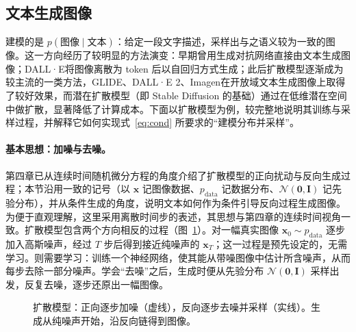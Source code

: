 \subsection{文本生成图像}
\label{sub:t2i}

建模的是 $p(\text{图像}\mid\text{文本})$：给定一段文字描述，采样出与之语义较为一致的图像。这一方向经历了较明显的方法演变：早期曾用生成对抗网络直接由文本生成图像；DALL·E\cite{dalle}将图像离散为 token 后以自回归方式生成；此后扩散模型逐渐成为较主流的一类方法，GLIDE\cite{glide}、DALL·E 2\cite{dalle2}、Imagen\cite{imagen}在开放域文本生成图像上取得了较好效果，而潜在扩散模型\cite{ldm}（即 Stable Diffusion 的基础）通过在低维潜在空间中做扩散，显著降低了计算成本。下面以扩散模型为例，较完整地说明其训练与采样过程，并解释它如何实现式~\eqref{eq:cond} 所要求的“建模分布并采样”。

\paragraph{基本思想：加噪与去噪。}第四章已从连续时间随机微分方程的角度介绍了扩散模型的正向扰动与反向生成过程；本节沿用一致的记号（以 $\mathbf{x}$ 记图像数据、$p_{\text{data}}$ 记数据分布、$\mathcal{N}(\mathbf{0},\mathbf{I})$ 记先验分布），并从条件生成的角度，说明文本如何作为条件引导反向过程生成图像。为便于直观理解，这里采用离散时间步的表述，其思想与第四章的连续时间视角一致。扩散模型包含两个方向相反的过程（图~\ref{fig:diffusion}）。对一幅真实图像 $\mathbf{x}_0\sim p_{\text{data}}$ 逐步加入高斯噪声，经过 $T$ 步后得到接近纯噪声的 $\mathbf{x}_T$；这一过程是预先设定的，无需学习。则需要学习：训练一个神经网络，使其能从带噪图像中估计所含噪声，从而每步去除一部分噪声。学会“去噪”之后，生成时便从先验分布 $\mathcal{N}(\mathbf{0},\mathbf{I})$ 采样出发，反复去噪，逐步还原出一幅图像。

\begin{figure}[htbp]
  \centering
  \caption{扩散模型：正向逐步加噪（虚线），反向逐步去噪并采样（实线）。生成从纯噪声开始，沿反向链得到图像。}
  \label{fig:diffusion}
\end{figure}

